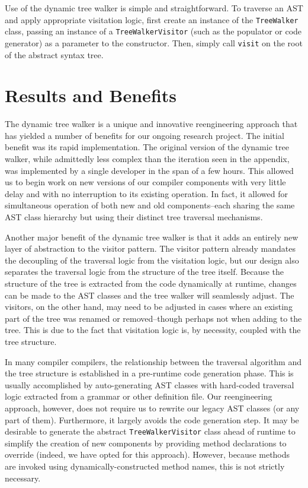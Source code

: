 \documentclass[times]{speauth}
\begin{document}
Use of the dynamic tree walker is simple and straightforward. To traverse an AST and apply appropriate visitation logic, first create an instance of the \texttt{TreeWalker} class, passing an instance of a \texttt{TreeWalkerVisitor} (such as the populator or code generator) as a parameter to the constructor. Then, simply call \texttt{visit} on the root of the abstract syntax tree.


\section{Results and Benefits}

The dynamic tree walker is a unique and innovative reengineering approach that has yielded a number of benefits for our ongoing research project. The initial benefit was its rapid implementation. The original version of the dynamic tree walker, while admittedly less complex than the iteration seen in the appendix, was implemented by a single developer in the span of a few hours. This allowed us to begin work on new versions of our compiler components with very little delay and with no interruption to its existing operation. In fact, it allowed for simultaneous operation of both new and old components--each sharing the same AST class hierarchy but using their distinct tree traversal mechanisms.

Another major benefit of the dynamic tree walker is that it adds an entirely new layer of abstraction to the visitor pattern. The visitor pattern already mandates the decoupling of the traversal logic from the visitation logic, but our design also separates the traversal logic from the structure of the tree itself. Because the structure of the tree is extracted from the code dynamically at runtime, changes can be made to the AST classes and the tree walker will seamlessly adjust. The visitors, on the other hand, may need to be adjusted in cases where an existing part of the tree was renamed or removed--though perhaps not when adding to the tree. This is due to the fact that visitation logic is, by necessity, coupled with the tree structure.

In many compiler compilers, the relationship between the traversal algorithm and the tree structure is established in a pre-runtime code generation phase. This is usually accomplished by auto-generating AST classes with hard-coded traversal logic extracted from a grammar or other definition file. Our reengineering approach, however, does not require us to rewrite our legacy AST classes (or any part of them). Furthermore, it largely avoids the code generation step. It may be desirable to generate the abstract \texttt{TreeWalkerVisitor} class ahead of runtime to simplify the creation of new components by providing method declarations to override (indeed, we have opted for this approach). However, because methods are invoked using dynamically-constructed method names, this is not strictly necessary.
\end{document}
